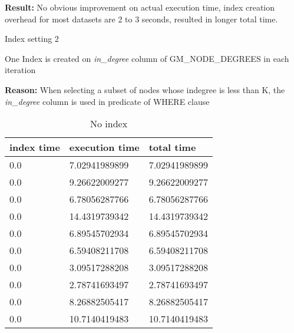 \begin{itemize*}
\par \textbf{Result:} No obvious improvement on actual execution time, index creation overhead for most datasets are 2 to 3 seconds, resulted in longer total time.
\item{Index setting 2}
\par One Index is created on \textit{in\_degree} column of GM\_NODE\_DEGREES in each iteration
\par \textbf{Reason:} When selecting a subset of nodes whose indegree is less than K, the \textit{in\_degree} column is used in predicate of WHERE clause

\begin{table}[H]
\begin{center}
\begin{tabular}{|l|l|l|}
\hline
index time & execution time & total time     \\ \hline
0.0 & 7.02941989899 & 7.02941989899 \\ \hline
0.0 & 9.26622009277 & 9.26622009277 \\ \hline
0.0 & 6.78056287766 & 6.78056287766 \\ \hline
0.0 & 14.4319739342 & 14.4319739342 \\ \hline
0.0 & 6.89545702934 & 6.89545702934 \\ \hline
0.0 & 6.59408211708 & 6.59408211708 \\ \hline
0.0 & 3.09517288208 & 3.09517288208 \\ \hline
0.0 & 2.78741693497 & 2.78741693497 \\ \hline
0.0 & 8.26882505417 & 8.26882505417 \\ \hline
0.0 & 10.7140419483 & 10.7140419483 \\ \hline
\end{tabular}
\end{center}
\caption{No index}
\end{table}


\end{itemize*}
